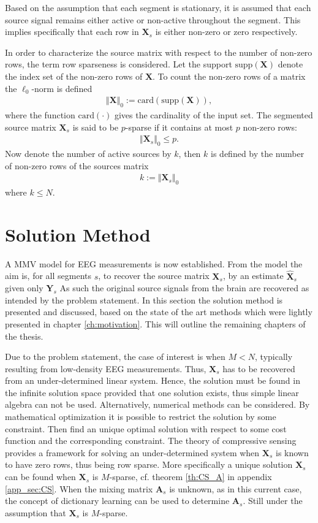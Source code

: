 Based on the assumption that each segment is stationary, it is assumed that each source signal remains either active or non-active throughout the segment. This implies specifically that each row in $\textbf{X}_s$ is either non-zero or zero respectively.   

In order to characterize the source matrix with respect to the number of non-zero rows, the term row sparseness is considered. 
Let the support $\text{supp}(\mathbf{X})$ denote the index set of the non-zero rows of $\mathbf{X}$.
To count the non-zero rows of a matrix the $\ell_0$-norm is defined 
\begin{align*}
\Vert \mathbf{X} \Vert_0 := \text{card}(\text{supp}(\mathbf{X})),
\end{align*}
where the function $\text{card}(\cdot)$ gives the cardinality of the input set. The segmented source matrix $\mathbf{X}_s$ is said to be $p$-sparse if it contains at most $p$ non-zero rows:
\begin{align*}
\Vert \mathbf{X}_s \Vert_0 \leq p.
\end{align*}
Now denote the number of active sources by $k$, then $k$ is defined by the number of non-zero rows of the sources matrix 
\begin{align*}
k := \Vert \mathbf{X}_s \Vert_0
\end{align*} 
where $k \leq N$. 

\section{Solution Method}\label{sec:sol_met}
A MMV model for EEG measurements is now established.
From the model the aim is, for all segments $s$, to recover the source matrix $\mathbf{X}_s$, by an estimate $\hat{\textbf{X}}_s$ given only $\textbf{Y}_s$
As such the original source signals from the brain are recovered as intended by the problem statement. 
In this section the solution method is presented and discussed, based on the state of the art methods which were lightly presented in chapter \ref{ch:motivation}. This will outline the remaining chapters of the thesis. 

Due to the problem statement, the case of interest is when $M < N$, typically resulting from low-density EEG measurements. 
Thus, $\mathbf{X}_s$ has to be recovered from an under-determined linear system. 
Hence, the solution must be found in the infinite solution space provided that one solution exists, thus simple linear algebra can not be used. 
Alternatively, numerical methods can be considered. By mathematical optimization it is possible to restrict the solution by some constraint. Then find an unique optimal solution with respect to some cost function and the corresponding constraint.
The theory of compressive sensing provides a framework for solving an under-determined system when $\mathbf{X}_s$ is known to have zero rows, thus being row sparse. 
More specifically a unique solution $\mathbf{X}_s$ can be found when $\mathbf{X}_s$ is $M$-sparse, cf. theorem \ref{th:CS_A} in appendix \ref{app_sec:CS}. 
When the mixing matrix $\mathbf{A}_s$ is unknown, as in this current case, the concept of dictionary learning can be used to determine $\mathbf{A}_s$. Still under the assumption that $\mathbf{X}_s$ is $M$-sparse.  

